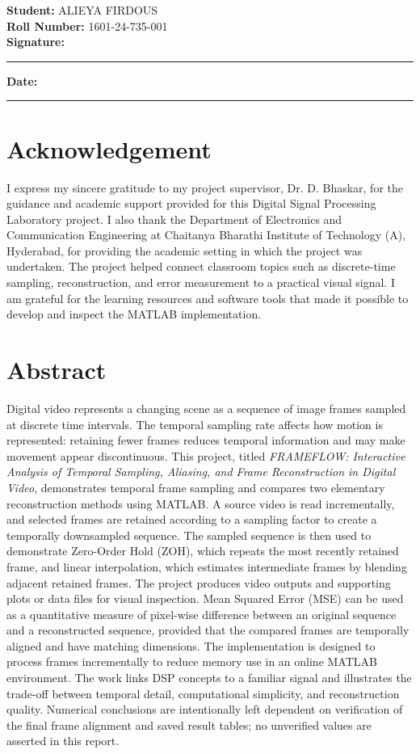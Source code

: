 \documentclass[12pt,a4paper,oneside]{report}
\begin{document}
\vspace{1cm}
\textbf{Student:} ALIEYA FIRDOUS\\
\textbf{Roll Number:} 1601-24-735-001\\[1cm]
\textbf{Signature:} \rule{5cm}{0.4pt} \hfill \textbf{Date:} \rule{3cm}{0.4pt}

\chapter*{Acknowledgement}
I express my sincere gratitude to my project supervisor, Dr. D. Bhaskar, for the guidance and academic support provided for this Digital Signal Processing Laboratory project. I also thank the Department of Electronics and Communication Engineering at Chaitanya Bharathi Institute of Technology (A), Hyderabad, for providing the academic setting in which the project was undertaken. The project helped connect classroom topics such as discrete-time sampling, reconstruction, and error measurement to a practical visual signal. I am grateful for the learning resources and software tools that made it possible to develop and inspect the MATLAB implementation.

\chapter*{Abstract}
Digital video represents a changing scene as a sequence of image frames sampled at discrete time intervals. The temporal sampling rate affects how motion is represented: retaining fewer frames reduces temporal information and may make movement appear discontinuous. This project, titled \textit{FRAMEFLOW: Interactive Analysis of Temporal Sampling, Aliasing, and Frame Reconstruction in Digital Video}, demonstrates temporal frame sampling and compares two elementary reconstruction methods using MATLAB. A source video is read incrementally, and selected frames are retained according to a sampling factor to create a temporally downsampled sequence. The sampled sequence is then used to demonstrate Zero-Order Hold (ZOH), which repeats the most recently retained frame, and linear interpolation, which estimates intermediate frames by blending adjacent retained frames. The project produces video outputs and supporting plots or data files for visual inspection. Mean Squared Error (MSE) can be used as a quantitative measure of pixel-wise difference between an original sequence and a reconstructed sequence, provided that the compared frames are temporally aligned and have matching dimensions. The implementation is designed to process frames incrementally to reduce memory use in an online MATLAB environment. The work links DSP concepts to a familiar signal and illustrates the trade-off between temporal detail, computational simplicity, and reconstruction quality. Numerical conclusions are intentionally left dependent on verification of the final frame alignment and saved result tables; no unverified values are asserted in this report.
\end{document}
